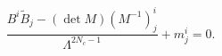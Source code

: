 \begin{equation}
  \frac{B^i \tilde{B}_{{j}} - (\det  M)
    (M^{-1})^{i}_{{j}}}{\Lambda^{2N_c-1}} + m^i_{j} = 0.
\end{equation}

